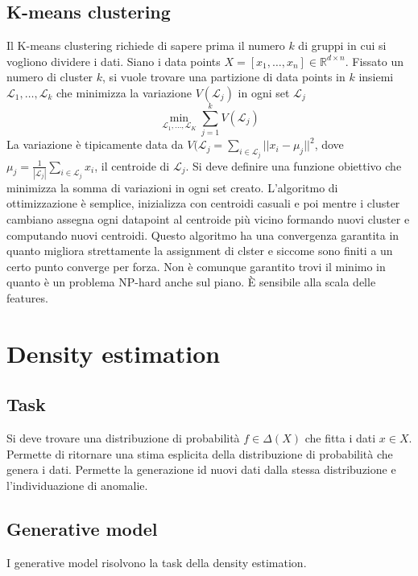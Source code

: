 	\subsection{K-means clustering}
	Il K-means clustering richiede di sapere prima il numero $k$ di gruppi in cui si vogliono dividere i dati.
	Siano i data points $X=[x_1,\dots,x_n]\in\mathbb{R}^{d\times n}$.
	Fissato un numero di cluster $k$, si vuole trovare una partizione di data points in $k$ insiemi $\mathcal{L}_1,\dots,\mathcal{L}_k$ che minimizza la variazione $V(\mathcal{L}_j)$ in ogni set $\mathcal{L}_j$
	$$\min\limits_{\mathcal{L}_1,\dots,\mathcal{L}_K}\sum\limits_{j = 1}^kV(\mathcal{L}_j)$$
	La variazione \`e tipicamente data da $V(\mathcal{L}_j = \sum\limits_{i\in\mathcal{L}_j}||x_i-\mu_j||^2$, dove $\mu_j = \frac{1}{|\mathcal{L}_j|}\sum\limits_{i\in\mathcal{L}_j}x_i$, il centroide di $\mathcal{L}_j$.
	Si deve definire una funzione obiettivo che minimizza la somma di variazioni in ogni set creato.
	L'algoritmo di ottimizzazione \`e semplice, inizializza con centroidi casuali e poi mentre i cluster cambiano assegna ogni datapoint al centroide pi\`u vicino formando nuovi cluster e computando nuovi centroidi.
	Questo algoritmo ha una convergenza garantita in quanto migliora strettamente la assignment di clster e siccome sono finiti a un certo punto converge per forza.
	Non \`e comunque garantito trovi il minimo in quanto \`e un problema NP-hard anche sul piano.
	\`E sensibile alla scala delle features.
\section{Density estimation}

	\subsection{Task}
	Si deve trovare una distribuzione di probabilit\`a $f\in \Delta(X)$ che fitta i dati $x\in X$.
	Permette di ritornare una stima esplicita della distribuzione di probabilit\`a che genera i dati.
	Permette la generazione id nuovi dati dalla stessa distribuzione e l'individuazione di anomalie.

	\subsection{Generative model}
	I generative model risolvono la task della density estimation.

